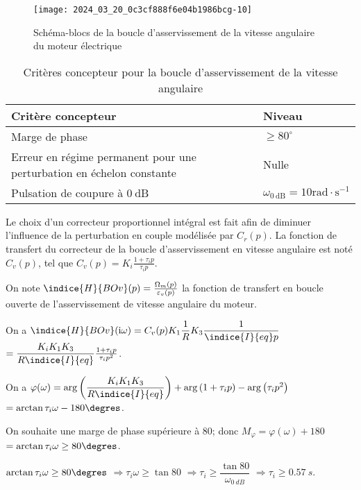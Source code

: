 \begin{figure}[!h]
\texttt{[image: 2024\_03\_20\_0c3cf888f6e04b1986bcg-10]}
\caption{Schéma-blocs de la boucle d'asservissement de la vitesse angulaire du moteur électrique \label{Cy_02_Ch_04_TD_02_fig_12}}
\end{figure}

\begin{table}[!h]
\begin{tabular}{p{9cm}l}
\hline
\textbf{Critère concepteur} & \textbf{Niveau} \\
\hline
Marge de phase & $\geqslant 80^{\circ}$ \\
Erreur en régime permanent pour une perturbation en échelon constante & Nulle \\
Pulsation de coupure à $0 \mathrm{~dB}$ & $\omega_{0 \mathrm{~dB}}=10 \mathrm{rad} \cdot \mathrm{s}^{-1}$ \\
\hline
\end{tabular}
\caption{Critères concepteur pour la boucle d'asservissement de la vitesse angulaire \label{Cy_02_Ch_04_TD_02_tab_04}}
\end{table}

Le choix d'un correcteur proportionnel intégral est fait afin de diminuer l'influence de la perturbation en couple modélisée par $C_{r}(p)$. La fonction de transfert du correcteur de la boucle d'asservissement en vitesse angulaire est noté $C_{v}(p)$, tel que $C_{v}(p)=K_{i} \frac{1+\tau_{i} p}{\tau_{i} p}$.


On note $\indice{H}{BOv}(p)=\frac{\Omega_{m}(p)}{\varepsilon_{v}(p)}$ la fonction de transfert en boucle ouverte de l'asservissement de vitesse angulaire du moteur.

\ifprof
\begin{corrige}
On a $\indice{H}{BOv}(\mathrm{i} \omega) = C_v(p)K_1 \dfrac{1}{R}K_3 \dfrac{1}{\indice{I}{eq}p}$
$= \dfrac{K_{i} K_1 K_3 }{R \indice{I}{eq}}  \frac{1+\tau_{i} p}{\tau_{i} p^2} $.

On a $\varphi(\omega)=\arg\left({\dfrac{K_{i} K_1 K_3 }{R \indice{I}{eq}}}\right) + \arg\left( 1+\tau_{i} p\right) - \arg\left( \tau_{i} p^2\right) $ $=\arctan{\tau_i \omega } - 180\degres$.

On souhaite une marge de phase supérieure à 80\degres; donc $M_{\varphi} = \varphi(\omega) + 180$  $=\arctan{\tau_i \omega} \geq 80\degres$.

$\arctan{\tau_i \omega} \geq 80\degres$ 
$\Rightarrow  \tau_i \omega \geq \tan 80$
$\Rightarrow  \tau_i  \geq \dfrac{\tan 80}{\omega_{\SI{0}{dB}}}$
$\Rightarrow  \tau_i  \geq \SI{0,57}{s}$.
\end{corrige}
\else
\fi

